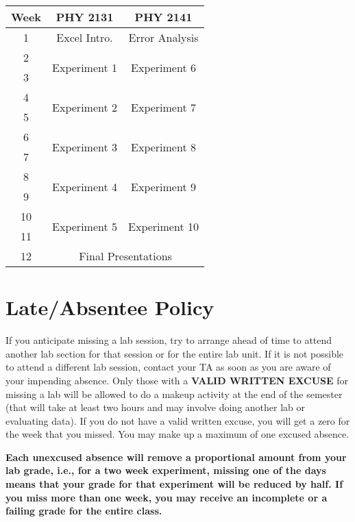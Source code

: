\begin{table}[ht]
	\centering
	\begin{tabular}{ |c||c|c| } 
	 \hline
	 \textbf{Week} & \textbf{PHY 2131} & \textbf{PHY 2141} \\
	 \hline
	 1 & Excel Intro. & Error Analysis \\ 
	 \hline 
	 2 & \multirow{2}{*}{Experiment 1} & \multirow{2}{*}{Experiment 6} \\ 
	 \cline{1-1}
	 3 &  &  \\ 
	 \hline
	 4 & \multirow{2}{*}{Experiment 2} & \multirow{2}{*}{Experiment 7} \\ 
	 \cline{1-1}
	 5 &  &  \\ 
	 \hline
	 6 & \multirow{2}{*}{Experiment 3} & \multirow{2}{*}{Experiment 8} \\ 
	 \cline{1-1}
	 7 &  &  \\ 
	 \hline
	 8 & \multirow{2}{*}{Experiment 4} & \multirow{2}{*}{Experiment 9} \\ 
	 \cline{1-1}
	 9 &  &   \\ 
	 \hline
	 10 & \multirow{2}{*}{Experiment 5} & \multirow{2}{*}{Experiment 10} \\ 
	 \cline{1-1}
	 11 &  &   \\ 
	 \hline
	 12 & \multicolumn{2}{c|}{Final Presentations} \\ 
	 \hline
	\end{tabular}
\end{table}

\section*{Late/Absentee Policy}
If you anticipate missing a lab session, try to arrange ahead of time to attend another lab section for that session or for the entire lab unit.
If it is not possible to attend a different lab session, contact your TA as soon as you are aware of your impending absence.
Only those with a \textbf{VALID WRITTEN EXCUSE} for missing a lab will be allowed to do a makeup activity at the end of the semester (that will take at least two hours and may involve doing another lab or evaluating data).
If you do not have a valid written excuse, you will get a zero for the week that you missed.
You may make up a maximum of one excused absence.
\par
\textbf{Each unexcused absence will remove a proportional amount from your lab grade, i.e., for a two week experiment, missing one of the days means that your grade for that experiment will be reduced by half.
If you miss more than one week, you may receive an incomplete or a failing grade for the entire class.}

